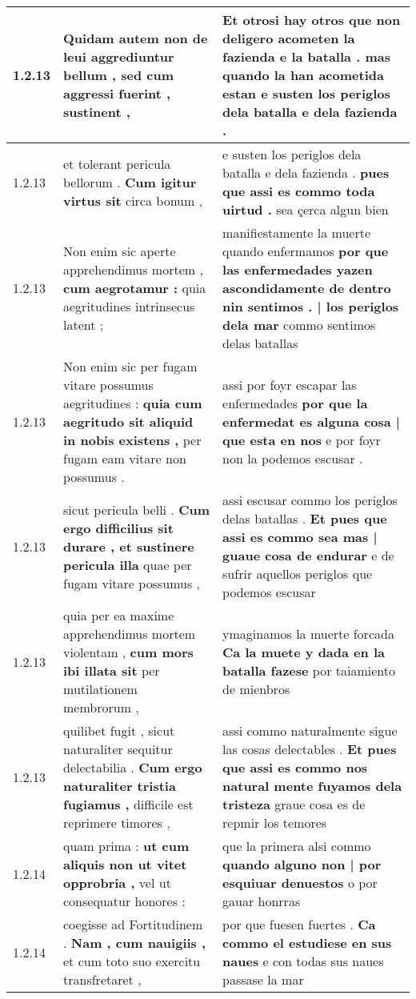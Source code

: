 \begin{tabular}{|p{1cm}|p{6.5cm}|p{6.5cm}|}
1.2.13 & Quidam autem non de leui aggrediuntur bellum , \textbf{ sed cum aggressi fuerint , } sustinent , & Et otrosi hay otros que non deligero acometen la fazienda e la batalla . \textbf{ mas quando la han acometida estan } e susten los periglos dela batalla e dela fazienda . \\\hline
1.2.13 & et tolerant pericula bellorum . \textbf{ Cum igitur virtus sit } circa bonum , & e susten los periglos dela batalla e dela fazienda . \textbf{ pues que assi es commo toda uirtud . } sea çerca algun bien \\\hline
1.2.13 & Non enim sic aperte apprehendimus mortem , \textbf{ cum aegrotamur : } quia aegritudines intrinsecus latent ; & manifiestamente la muerte quando enfermamos \textbf{ por que las enfermedades yazen ascondidamente de dentro nin sentimos . | los periglos dela mar } commo sentimos delas batallas \\\hline
1.2.13 & Non enim sic per fugam vitare possumus aegritudines : \textbf{ quia cum aegritudo sit aliquid in nobis existens , } per fugam eam vitare non possumus . & assi por foyr escapar las enfermedades \textbf{ por que la enfermedat es alguna cosa | que esta en nos } e por foyr non la podemos escusar . \\\hline
1.2.13 & sicut pericula belli . \textbf{ Cum ergo difficilius sit durare , et sustinere pericula illa } quae per fugam vitare possumus , & assi escusar commo los periglos delas batallas . \textbf{ Et pues que assi es commo sea mas | guaue cosa de endurar } e de sufrir aquellos periglos que podemos escusar \\\hline
1.2.13 & quia per ea maxime apprehendimus mortem violentam , \textbf{ cum mors ibi illata sit } per mutilationem membrorum , & ymaginamos la muerte forcada \textbf{ Ca la muete y dada en la batalla fazese } por taiamiento de mienbros \\\hline
1.2.13 & quilibet fugit , sicut naturaliter sequitur delectabilia . \textbf{ Cum ergo naturaliter tristia fugiamus , } difficile est reprimere timores , & assi commo naturalmente sigue las cosas delectables . \textbf{ Et pues que assi es commo nos natural mente fuyamos dela tristeza } graue cosa es de repmir los temores \\\hline
1.2.14 & quam prima : \textbf{ ut cum aliquis non ut vitet opprobria , } vel ut consequatur honores : & que la primera alsi commo \textbf{ quando alguno non | por esquiuar denuestos } o por gauar honrras \\\hline
1.2.14 & coegisse ad Fortitudinem . \textbf{ Nam , cum nauigiis , } et cum toto suo exercitu transfretaret , & por que fuesen fuertes . \textbf{ Ca commo el estudiese en sus naues } e con todas sus naues passase la mar \\\hline

\end{tabular}
